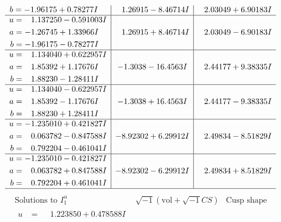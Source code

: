\documentclass[1p]{elsarticle_modified}
\theoremstyle{definition}
\newcommand{\I}{\sqrt{-1}}
\begin{document}
$$\begin{array}{c|c|c}
\begin{aligned}
b &= -1.96175 + 0.78277 I\end{aligned}
 & \phantom{-}1.26915 - 8.46714 I & \phantom{-}2.03049 + 6.90183 I \\ \hline\begin{aligned}
u &= \phantom{-}1.137250 - 0.591003 I \\
a &= -1.26745 + 1.33966 I \\
b &= -1.96175 - 0.78277 I\end{aligned}
 & \phantom{-}1.26915 + 8.46714 I & \phantom{-}2.03049 - 6.90183 I \\ \hline\begin{aligned}
u &= \phantom{-}1.134040 + 0.622957 I \\
a &= \phantom{-}1.85392 + 1.17676 I \\
b &= \phantom{-}1.88230 - 1.28411 I\end{aligned}
 & -1.3038 - 16.4563 I & \phantom{-}2.44177 + 9.38335 I \\ \hline\begin{aligned}
u &= \phantom{-}1.134040 - 0.622957 I \\
a &= \phantom{-}1.85392 - 1.17676 I \\
b &= \phantom{-}1.88230 + 1.28411 I\end{aligned}
 & -1.3038 + 16.4563 I & \phantom{-}2.44177 - 9.38335 I \\ \hline\begin{aligned}
u &= -1.235010 + 0.421827 I \\
a &= \phantom{-}0.063782 - 0.847588 I \\
b &= \phantom{-}0.792204 - 0.461041 I\end{aligned}
 & -8.92302 + 6.29912 I & \phantom{-}2.49834 - 8.51829 I \\ \hline\begin{aligned}
u &= -1.235010 - 0.421827 I \\
a &= \phantom{-}0.063782 + 0.847588 I \\
b &= \phantom{-}0.792204 + 0.461041 I\end{aligned}
 & -8.92302 - 6.29912 I & \phantom{-}2.49834 + 8.51829 I\\
 \hline 
 \end{array}$$\newpage$$\begin{array}{c|c|c}  
\text{Solutions to }I^u_{1}& \I (\text{vol} + \sqrt{-1}CS) & \text{Cusp shape}\\
 \hline 
\begin{aligned}
u &= \phantom{-}1.223850 + 0.478588 I \\

\end{aligned}
\end{array}$$
\end{document}
